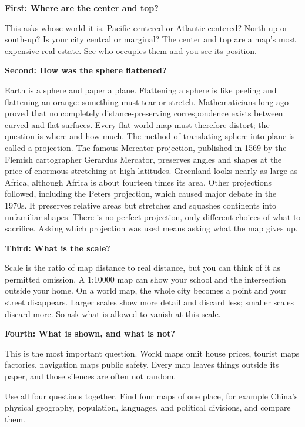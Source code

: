\textbf{First: Where are the center and top?}

This asks whose world it is. Pacific-centered or Atlantic-centered? North-up or south-up? Is your city central or marginal? The center and top are a map's most expensive real estate. See who occupies them and you see its position.

\textbf{Second: How was the sphere flattened?}

Earth is a sphere and paper a plane. Flattening a sphere is like peeling and flattening an orange: something must tear or stretch. Mathematicians long ago proved that no completely distance-preserving correspondence exists between curved and flat surfaces. Every flat world map must therefore distort; the question is where and how much. The method of translating sphere into plane is called a projection. The famous Mercator projection, published in 1569 by the Flemish cartographer Gerardus Mercator, preserves angles and shapes at the price of enormous stretching at high latitudes. Greenland looks nearly as large as Africa, although Africa is about fourteen times its area. Other projections followed, including the Peters projection, which caused major debate in the 1970s. It preserves relative areas but stretches and squashes continents into unfamiliar shapes. There is no perfect projection, only different choices of what to sacrifice. Asking which projection was used means asking what the map gives up.

\textbf{Third: What is the scale?}

Scale is the ratio of map distance to real distance, but you can think of it as permitted omission. A 1:10000 map can show your school and the intersection outside your home. On a world map, the whole city becomes a point and your street disappears. Larger scales show more detail and discard less; smaller scales discard more. So ask what is allowed to vanish at this scale.

\textbf{Fourth: What is shown, and what is not?}

This is the most important question. World maps omit house prices, tourist maps factories, navigation maps public safety. Every map leaves things outside its paper, and those silences are often not random.

Use all four questions together. Find four maps of one place, for example China's physical geography, population, languages, and political divisions, and compare them.

